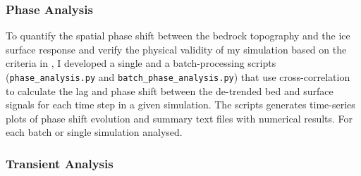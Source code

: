 \subsubsection{Phase Analysis}
To quantify the spatial phase shift between the bedrock topography and the ice surface response and verify the physical validity of my simulation based on the criteria in \cite{Budd_1970}, I developed a single and a batch-processing scripts (\texttt{phase\_analysis.py} and \texttt{batch\_phase\_analysis.py}) that use cross-correlation to calculate the lag and phase shift between the de-trended bed and surface signals for each time step in a given simulation. The scripts generates time-series plots of phase shift evolution and summary text files with numerical results. For each batch or single simulation analysed.




\subsubsection{Transient Analysis}


